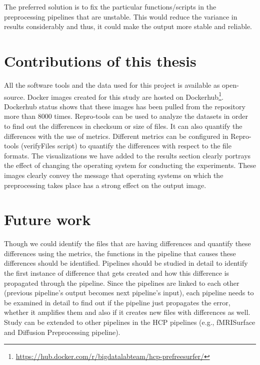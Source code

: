 The preferred solution is to fix the particular functions/scripts in the preprocessing pipelines that are unstable. This would reduce the variance in results considerably and thus, it could make the output more stable and reliable.

\section{Contributions of this thesis}
All the software tools and the data used for this project is available as open-source.
 Docker images created for this study are hosted on 
 Dockerhub\footnote{\url{https://hub.docker.com/r/bigdatalabteam/hcp-prefreesurfer/}}. 
 Dockerhub status shows that these images has been pulled from the 
 repository more than 8000 times. Repro-tools can be used to analyze 
 the datasets in order to find out the differences in checksum or size 
 of files. It can also quantify the differences with the use of 
 metrics. Different metrics can be configured in Repro-tools 
 (verifyFiles script) to quantify the differences with respect to the 
 file formats. The visualizations we have added to the results section 
 clearly portrays the effect of changing the operating system for 
 conducting the experiments. These images clearly convey the message 
 that operating systems on which the preprocessing takes place has a 
 strong effect on the output image.

\section{Future work}
Though we could identify the files that are having differences and quantify these differences using the metrics, the functions in the pipeline that causes these differences should be identified.
Pipelines should be studied in detail to identify the first instance of difference that gets created and how this difference is propagated through the pipeline.
Since the pipelines are linked to each other (previous pipeline's output becomes next pipeline's input), each pipeline needs to be examined in detail to find out if the pipeline just propagates the error, whether it amplifies them and also if it creates new files with differences as well. 
Study can be extended to other pipelines in the HCP pipelines (e.g., fMRISurface and Diffusion Preprocessing pipeline).
